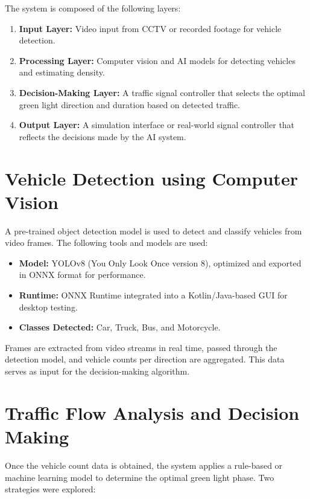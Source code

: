 The system is composed of the following layers:

\begin{enumerate}
    \item \textbf{Input Layer:} Video input from CCTV or recorded footage for vehicle detection.
    \item \textbf{Processing Layer:} Computer vision and AI models for detecting vehicles and estimating density.
    \item \textbf{Decision-Making Layer:} A traffic signal controller that selects the optimal green light direction and duration based on detected traffic.
    \item \textbf{Output Layer:} A simulation interface or real-world signal controller that reflects the decisions made by the AI system.
\end{enumerate}

\section{Vehicle Detection using Computer Vision}

A pre-trained object detection model is used to detect and classify vehicles from video frames. The following tools and models are used:

\begin{itemize}
    \item \textbf{Model:} YOLOv8 (You Only Look Once version 8), optimized and exported in ONNX format for performance.
    \item \textbf{Runtime:} ONNX Runtime integrated into a Kotlin/Java-based GUI for desktop testing.
    \item \textbf{Classes Detected:} Car, Truck, Bus, and Motorcycle.
\end{itemize}

Frames are extracted from video streams in real time, passed through the detection model, and vehicle counts per direction are aggregated. This data serves as input for the decision-making algorithm.

\section{Traffic Flow Analysis and Decision Making}

Once the vehicle count data is obtained, the system applies a rule-based or machine learning model to determine the optimal green light phase. Two strategies were explored:

